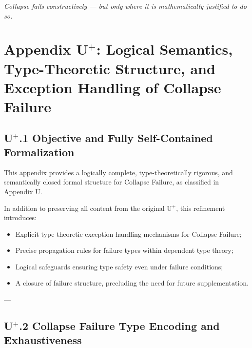 \documentclass[11pt]{article}
\begin{document}
\begin{center}
\textit{Collapse fails constructively — but only where it is mathematically justified to do so.}
\end{center}




\section*{Appendix U$^{+}$: Logical Semantics, Type-Theoretic Structure, and Exception Handling of Collapse Failure}

\subsection*{U$^{+}$.1 Objective and Fully Self-Contained Formalization}

This appendix provides a logically complete, type-theoretically rigorous, and semantically closed formal structure for Collapse Failure, as classified in Appendix U.

In addition to preserving all content from the original U$^{+}$, this refinement introduces:

\begin{itemize}
    \item Explicit type-theoretic exception handling mechanisms for Collapse Failure;
    \item Precise propagation rules for failure types within dependent type theory;
    \item Logical safeguards ensuring type safety even under failure conditions;
    \item A closure of failure structure, precluding the need for future supplementation.
\end{itemize}

---

\subsection*{U$^{+}$.2 Collapse Failure Type Encoding and Exhaustiveness}
\end{document}

